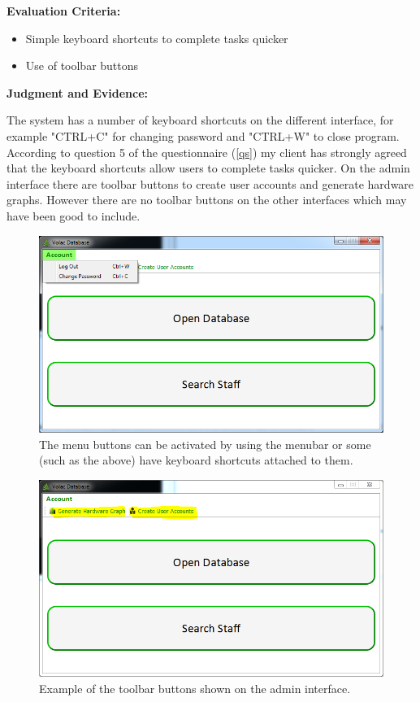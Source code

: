 \textbf{Evaluation Criteria:}
\begin{itemize}
\item{Simple keyboard shortcuts to complete tasks quicker}
\item{Use of toolbar buttons}
\end{itemize}

\textbf{Judgment and Evidence:}

The system has a number of keyboard shortcuts on the different interface, for example "CTRL+C" for changing password and "CTRL+W" to close program. According to question 5 of the questionnaire (\ref{qs}) my client has strongly agreed that the keyboard shortcuts allow users to complete tasks quicker. On the admin interface there are toolbar buttons to create user accounts and generate hardware graphs. However there are no toolbar buttons on the other interfaces which may have been good to include.

\begin{figure}[H]
    \includegraphics[width=\textwidth]{./Evaluation/Images/shortcuts1.png}
    \caption{The menu buttons can be activated by using the menubar or some (such as the above) have keyboard shortcuts attached to them.} 
\end{figure}

\begin{figure}[H]
    \includegraphics[width=\textwidth]{./Evaluation/Images/toolbarbtns.png}
    \caption{Example of the toolbar buttons shown on the admin interface.} 
\end{figure}

